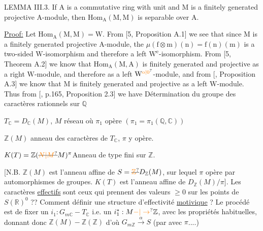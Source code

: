 LEMMA III.3. If $\mathrm A$ is a commutative ring with unit and $\mathrm M$ is a finitely generated projective $\mathrm A$-module, then $\mathrm{Hom}_{\mathrm A}(\mathrm M,\mathrm M)$ is separable over $\mathrm A$.

\uline{Proof:} Let $\mathrm{Hom}_{\mathrm A}(\mathrm M,\mathrm M)=\mathrm W$. From [5, Proposition A.1] we see that since $\mathrm M$ is a finitely generated projective $\mathrm A$-module, the  $\mu(\mathrm f\otimes\mathrm m)(\mathrm n)=\mathrm f(\mathrm n)(\mathrm m)$ is a two-sided $\mathrm W$-isomorphism and therefore a left $\mathrm W^{\mathrm e}$-isomorphism. From [5, Theorem A.2] we know that $\mathrm{Hom}_{\mathrm A}(\mathrm M,\mathrm A)$ is finitely generated and projective as a right $\mathrm W$-module, and therefore as a left $\mathrm W^{\unsure{\mathrm{o}|0}}$-module, and from [, Proposition A.3] we know that $\mathrm M$ is finitely generated and projective as a left $\mathrm W$-module. Thus from [, p.165, Proposition 2.3] we have
Détermination du groupe des caractères rationnels sur $\mathbb Q$

$T_{\mathbb C}=D_{\mathbb C}(M)$, $M$ réseau où $\pi_1$ opère  $(\pi_1=\pi_1(\mathbb Q,\mathbb C))$

$\mathbb Z(M)$ anneau des caractères  de $T_{\mathbb C}$, $\pi$ y opère.

$K(T)=\mathbb Z(\deleted{\unsure{N|M}}M)^\pi$\qquad Anneau de type fini sur $\mathbb Z$.

[N.B. $\mathbb Z(M)$ est l'anneau affine de $S=\deleted{\unsure{\mathbb Z}}D_{\mathbb Z}(M)$, sur lequel $\pi$ opère par automorphismes de groupes. $K(T)$ est l'anneau affine de $D_{\mathbb Z}(M)/\pi$]. Les caractères \uline{effectifs} sont ceux qui prennent des valeurs $\geq 0$ sur les points de $S(\mathbb R)^0$ ??  Comment définir une structure d'effectivité \uline{motivique} ? Le procédé  est de  fixer un $i_1:G_{m\mathbb C}-T_{\mathbb C}$ i.e. un $i_1^*:M\unsure{-|\to}\mathbb Z$, avec les propriétés habituelles,  donnant donc $\mathbb Z(M)-\mathbb Z(\mathbb Z)$ d'où $G_{m\mathbb Z}\xrightarrow{\alpha}S$ (par  avec $\pi$....)

